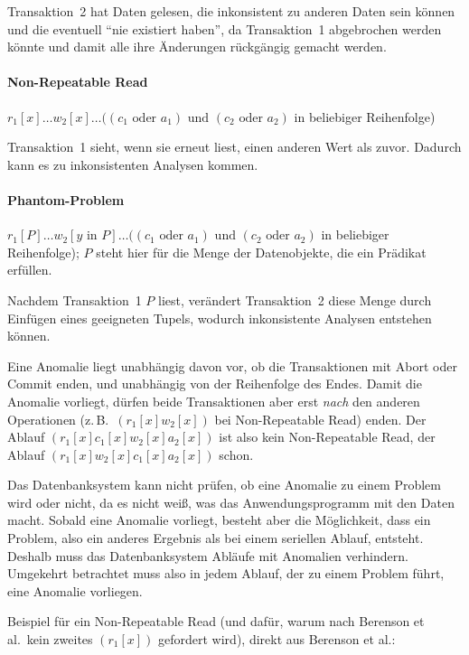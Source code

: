 \begin{enumerate}[a)]
\begin{solution}
Transaktion~2 hat Daten gelesen, die inkonsistent zu anderen Daten sein können und die eventuell "`nie existiert haben"', da Transaktion~1 abgebrochen werden könnte und damit alle ihre Änderungen rückgängig gemacht werden.

\paragraph{\color{solutioncolor}Non-Repeatable Read}
$r_1[x] \ldots w_2[x] \ldots
((c_1 \textrm{ oder } a_1) \textrm{ und } (c_2 \textrm{ oder } a_2)$
in beliebiger Reihenfolge)

Transaktion~1 sieht, wenn sie erneut liest, einen anderen Wert als zuvor. Dadurch kann es zu inkonsistenten Analysen kommen.

\paragraph{\color{solutioncolor}Phantom-Problem}
$r_1[P] \ldots w_2[y \textrm{ in } P] \ldots
((c_1 \textrm{ oder } a_1) \textrm{ und } (c_2 \textrm{ oder } a_2)$
in beliebiger Reihenfolge);
$P$ steht hier für die Menge der Datenobjekte, die ein Prädikat erfüllen.

Nachdem Transaktion~1 $P$ liest, verändert Transaktion~2 diese Menge durch Einfügen eines geeigneten Tupels, wodurch inkonsistente Analysen entstehen können.
\end{solution}

\begin{note}
Eine Anomalie liegt unabhängig davon vor, ob die Transaktionen mit Abort oder Commit enden, und unabhängig von der Reihenfolge des Endes. Damit die Anomalie vorliegt, dürfen beide Transaktionen aber erst \emph{nach} den anderen Operationen (z.\,B.\ $(r_1[x] w_2[x])$ bei Non-Repeatable Read) enden. Der Ablauf $(r_1[x] c_1[x] w_2[x] a_2[x])$ ist also kein Non-Repeatable Read, der Ablauf $(r_1[x] w_2[x] c_1[x] a_2[x])$ schon.

Das Datenbanksystem kann nicht prüfen, ob eine Anomalie zu einem Problem wird oder nicht, da es nicht weiß, was das Anwendungsprogramm mit den Daten macht. Sobald eine Anomalie vorliegt, besteht aber die Möglichkeit, dass ein Problem, also ein anderes Ergebnis als bei einem seriellen Ablauf, entsteht. Deshalb muss das Datenbanksystem Abläufe mit Anomalien verhindern. Umgekehrt betrachtet muss also in jedem Ablauf, der zu einem Problem führt, eine Anomalie vorliegen.

Beispiel für ein Non-Repeatable Read (und dafür, warum nach Berenson et al.\ kein zweites $(r_1[x])$ gefordert wird), direkt aus Berenson et al.:


\end{note}
\end{enumerate}
